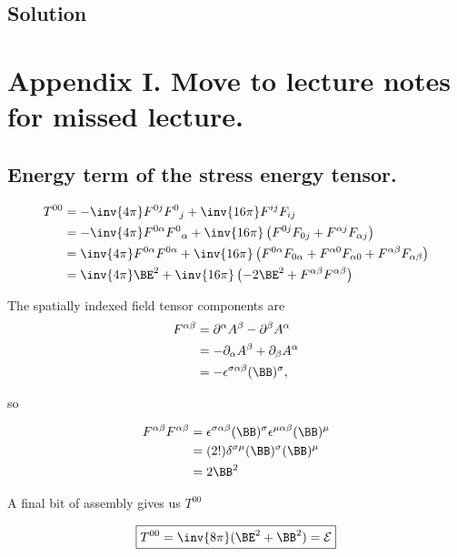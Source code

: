 \subsection{Solution}

\section{Appendix I.  Move to lecture notes for missed lecture.}

\subsection{Energy term of the stress energy tensor.}

\begin{align*}
T^{ 0 0 } 
&=
-\inv{4 \pi} F^{ 0 j} {F^0}_j + \inv{16 \pi} F^{i j} F_{i j} \\
&=
-\inv{4 \pi} F^{ 0 \alpha} {F^0}_\alpha + \inv{16 \pi} \left(
F^{0 j} F_{0 j} 
+F^{\alpha j} F_{\alpha j} 
\right)
\\
&=
\inv{4 \pi} F^{ 0 \alpha} F^{0 \alpha} + \inv{16 \pi} 
\left(
F^{0 \alpha} F_{0 \alpha} 
+F^{\alpha 0} F_{\alpha 0} 
+F^{\alpha \beta} F_{\alpha \beta} 
\right)
\\
&=
\inv{4 \pi} \BE^2 + \inv{16 \pi} \left(
-2 \BE^2 +F^{\alpha \beta} F^{\alpha \beta} 
\right)
\end{align*}

The spatially indexed field tensor components are
\begin{align*}
F^{\alpha \beta} 
&= \partial^\alpha A^\beta - \partial^\beta A^\alpha \\
&= -\partial_\alpha A^\beta + \partial_\beta A^\alpha \\
&= -\epsilon^{\sigma \alpha \beta} (\BB)^\sigma,
\end{align*}

so

\begin{align*}
F^{\alpha \beta} F^{\alpha \beta} 
&= 
\epsilon^{\sigma \alpha \beta} (\BB)^\sigma
\epsilon^{\mu \alpha \beta} (\BB)^\mu \\
&= (2!) \delta^{\sigma \mu} 
(\BB)^\sigma
(\BB)^\mu \\
&= 2 \BB^2
\end{align*}

A final bit of assembly gives us $T^{0 0}$

\begin{equation}\label{eqn:relativisticElectrodynamicsPS6:200}
\boxed{
T^{ 0 0 } = \inv{8 \pi} ( \BE^2 + \BB^2 ) = \mathcal{E}
}
\end{equation}

